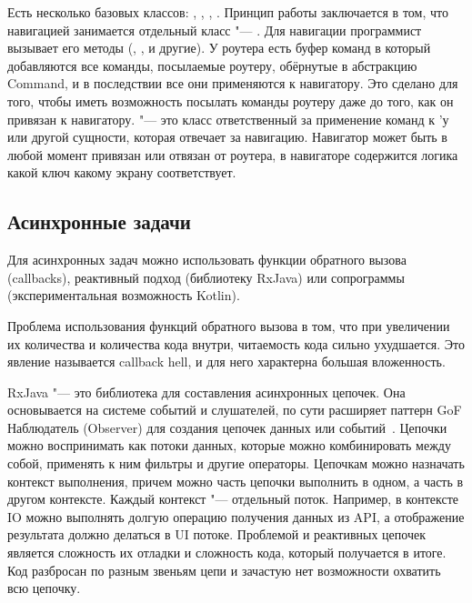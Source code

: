 Есть несколько базовых классов: , , , .
Принцип работы заключается в том, что навигацией занимается отдельный класс "--- .
Для навигации программист вызывает его методы (, ,  и другие).
У роутера есть буфер команд в который добавляются все команды, посылаемые роутеру, обёрнутые в абстракцию Command, и в последствии все они применяются к навигатору.
Это сделано для того, чтобы иметь возможность посылать команды роутеру даже до того, как он привязан к навигатору.
 "--- это класс ответственный за применение команд к 'у или другой сущности, которая отвечает за навигацию.
Навигатор может быть в любой момент привязан или отвязан от роутера, в навигаторе содержится логика какой ключ какому экрану соответствует.

\subsection{Асинхронные задачи}
\label{subsec:asyncTasks}
Для асинхронных задач можно использовать функции обратного вызова (callbacks), реактивный подход (библиотеку RxJava) или сопрограммы (экспериментальная возможность Kotlin).

Проблема использования функций обратного вызова в том, что при увеличении их количества и количества кода внутри, читаемость кода сильно ухудшается.
Это явление называется callback hell, и для него характерна большая вложенность.

RxJava "--- это библиотека для составления асинхронных цепочек.
Она основывается на системе событий и слушателей, по сути расширяет паттерн GoF Наблюдатель (Observer) для создания цепочек данных или событий~\cite{reactivex}.
Цепочки можно воспринимать как потоки данных, которые можно комбинировать между собой, применять к ним фильтры и другие операторы.
Цепочкам можно назначать контекст выполнения, причем можно часть цепочки выполнить в одном, а часть в другом контексте.
Каждый контекст "--- отдельный поток.
Например, в контексте IO можно выполнять долгую операцию получения данных из API, а отображение результата должно делаться в UI потоке.
Проблемой и реактивных цепочек является сложность их отладки и сложность кода, который получается в итоге.
Код разбросан по разным звеньям цепи и зачастую нет возможности охватить всю цепочку.

